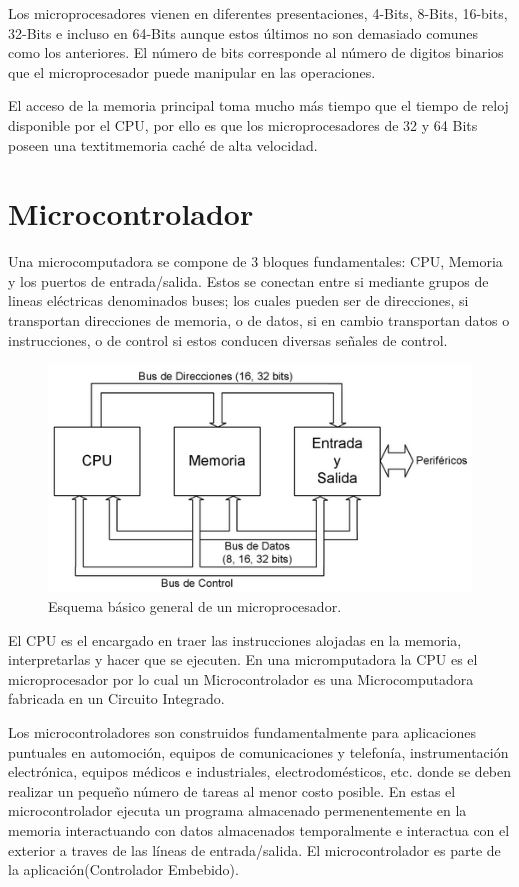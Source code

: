 \documentclass[letterpaper,12pt,oneside]{book}
\begin{document}
		Los microprocesadores vienen en diferentes presentaciones, 4-Bits, 8-Bits, 16-bits, 32-Bits e incluso en 64-Bits aunque estos últimos no son demasiado comunes como los anteriores. El número de bits corresponde al número de digitos binarios que el microprocesador puede manipular en las operaciones.

		El acceso de la memoria principal toma mucho más tiempo que el tiempo de reloj disponible por el CPU, por ello es que los microprocesadores de 32 y 64 Bits poseen una textit{memoria caché} de alta velocidad.

		\section{Microcontrolador}
		Una microcomputadora se compone de 3 bloques fundamentales: CPU, Memoria y los puertos de entrada/salida. Estos se conectan entre si mediante grupos de lineas eléctricas denominados buses; los cuales pueden ser de direcciones, si transportan direcciones de memoria, o de datos, si en cambio transportan datos o instrucciones, o de control si estos conducen diversas señales de control.

		\begin{figure}[!htpb]
			\centering
			\includegraphics[scale = 1.0]{Material de Consulta/EsqMicro.PNG}
			\caption[Esquema básico general de un microprocesador]{Esquema básico general de un microprocesador.}
			\label{EsqMicro}
		\end{figure}

		El CPU es el encargado en traer las instrucciones alojadas en la memoria, interpretarlas y hacer que se ejecuten. En una micromputadora la CPU es el microprocesador por lo cual un Microcontrolador es una Microcomputadora fabricada en un Circuito Integrado.

		Los microcontroladores son construidos fundamentalmente para aplicaciones puntuales en automoción, equipos de comunicaciones y telefonía, instrumentación electrónica, equipos médicos e industriales, electrodomésticos, etc. donde se deben realizar un pequeño número de tareas al menor costo posible. En estas el microcontrolador ejecuta un programa almacenado permenentemente en la memoria interactuando con datos almacenados temporalmente e interactua con el exterior a traves de las líneas de entrada/salida. El microcontrolador es parte de la aplicación(Controlador Embebido).
\end{document}
